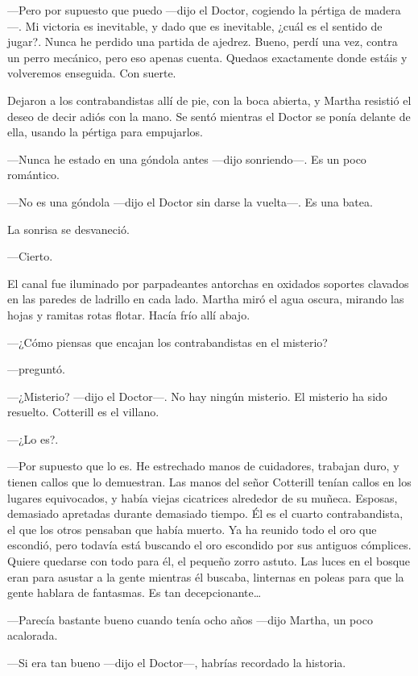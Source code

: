 ---Pero por supuesto que puedo ---dijo el Doctor, cogiendo la pértiga de madera---. Mi victoria es inevitable, y dado que es inevitable, ¿cuál es el sentido de jugar?. Nunca he perdido una partida de ajedrez. Bueno, perdí una vez, contra un perro mecánico, pero eso apenas cuenta. Quedaos exactamente donde estáis y volveremos enseguida. Con suerte.

Dejaron a los contrabandistas allí de pie, con la boca abierta, y Martha resistió el deseo de decir adiós con la mano. Se sentó mientras el Doctor se ponía delante de ella, usando la pértiga para empujarlos.

---Nunca he estado en una góndola antes ---dijo sonriendo---. Es un poco romántico.

---No es una góndola ---dijo el Doctor sin darse la vuelta---. Es una batea.

La sonrisa se desvaneció.

---Cierto.

El canal fue iluminado por parpadeantes antorchas en oxidados soportes clavados en las paredes de ladrillo en cada lado. Martha miró el agua oscura, mirando las hojas y ramitas rotas flotar. Hacía frío allí abajo.

---¿Cómo piensas que encajan los contrabandistas en el misterio?

---preguntó.

---¿Misterio? ---dijo el Doctor---. No hay ningún misterio. El misterio ha sido resuelto. Cotterill es el villano.

---¿Lo es?.

---Por supuesto que lo es. He estrechado manos de cuidadores, trabajan duro, y tienen callos que lo demuestran. Las manos del señor Cotterill tenían callos en los lugares equivocados, y había viejas cicatrices alrededor de su muñeca. Esposas, demasiado apretadas durante demasiado tiempo. Él es el cuarto contrabandista, el que los otros pensaban que había muerto. Ya ha reunido todo el oro que escondió, pero todavía está buscando el oro escondido por sus antiguos cómplices. Quiere quedarse con todo para él, el pequeño zorro astuto. Las luces en el bosque eran para asustar a la gente mientras él buscaba, linternas en poleas para que la gente hablara de fantasmas. Es tan decepcionante\ldots{}

---Parecía bastante bueno cuando tenía ocho años ---dijo Martha, un poco acalorada.

---Si era tan bueno ---dijo el Doctor---, habrías recordado la historia.

